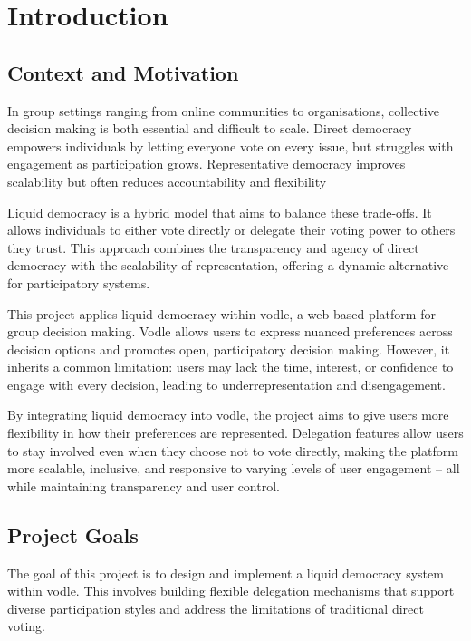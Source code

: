 \chapter{Introduction}\label{ch:introduction}

\section{Context and Motivation}

In group settings ranging from online communities to organisations, collective decision making is both essential and difficult to scale. Direct democracy empowers individuals by letting everyone vote on every issue, but struggles with engagement as participation grows. Representative democracy improves scalability but often reduces accountability and flexibility \citep{ford_delegative_2002, blum_liquid_2016}

Liquid democracy is a hybrid model that aims to balance these trade-offs. It allows individuals to either vote directly or delegate their voting power to others they trust. This approach combines the transparency and agency of direct democracy with the scalability of representation, offering a dynamic alternative for participatory systems.

This project applies liquid democracy within vodle, a web-based platform for group decision making. Vodle allows users to express nuanced preferences across decision options and promotes open, participatory decision making. However, it inherits a common limitation: users may lack the time, interest, or confidence to engage with every decision, leading to underrepresentation and disengagement.

By integrating liquid democracy into vodle, the project aims to give users more flexibility in how their preferences are represented. Delegation features allow users to stay involved even when they choose not to vote directly, making the platform more scalable, inclusive, and responsive to varying levels of user engagement -- all while maintaining transparency and user control.

\section{Project Goals}

The goal of this project is to design and implement a liquid democracy system within vodle. This involves building flexible delegation mechanisms that support diverse participation styles and address the limitations of traditional direct voting.

